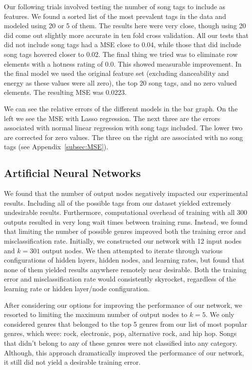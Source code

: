 \documentclass[12pt]{article}
\begin{document}
Our following trials involved testing the number of song tags to include as features. We found a sorted list of the most prevalent tags in the data and modeled using 20 or 5 of them. The results here were very close, though using 20 did come out slightly more accurate in ten fold cross validation. All our tests that did not include song tags had a MSE close to 0.04, while those that did include song tags hovered closer to 0.02. The final thing we tried was to eliminate row elements with a hotness rating of 0.0. This showed measurable improvement. In the final model we used the original feature set (excluding danceability and energy as these values were all zero), the top 20 song tags, and no zero valued elements. The resulting MSE was 0.0223.

We can see the relative errors of the different models in the bar graph. On the left we see the MSE with Lasso regression. The next three are the errors associated with normal linear regression with song tags included. The lower two are corrected for zero values. The three on the right are associated with no song tags (see Appendix~\ref{subsec:MSE}).
\subsection{Artificial Neural Networks}
\label{subsec:annResults}
We found that the number of output nodes negatively impacted our experimental results. Including all of the possible tags from our dataset yielded extremely undesirable results. Furthermore, computational overhead of training with all 300 outputs resulted in very long wait times between training runs. Instead, we found that limiting the number of possible genres improved both the training error and misclassification rate. Initially, we constructed our network with 12 input nodes and $k = 301$ output nodes. We then attempted to iterate through various configurations of hidden layers, hidden nodes, and learning rates, but found that none of them yielded results anywhere remotely near desirable. Both the training error and misclassification rate would consistently skyrocket, regardless of the learning rate or hidden layer/node configuration.

After considering our options for improving the performance of our network, we resorted to limiting the maximum number of output nodes to $k = 5$. We only considered genres that belonged to the top 5 genres from our list of most popular genres, which were: rock, electronic, pop, alternative rock, and hip hop. Songs that didn't belong to any of these genres were not classified into any category. Although, this approach dramatically improved the performance of our network, it still did not yield a desirable training error.
\end{document}
